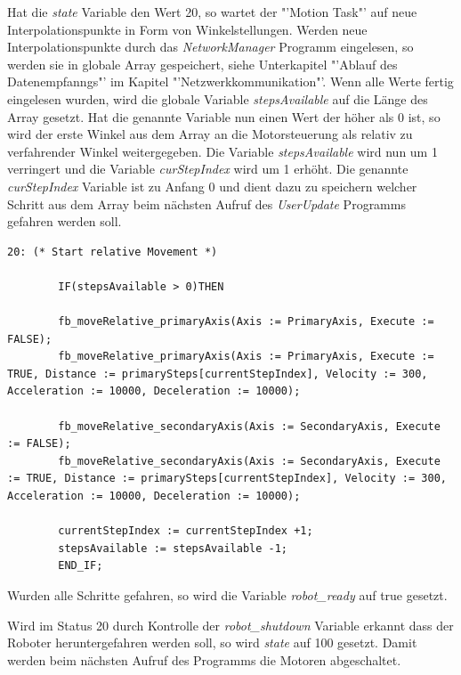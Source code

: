 Hat die \textit{state} Variable den Wert 20, so wartet der "'Motion Task"' auf neue Interpolationspunkte in Form von Winkelstellungen. Werden neue Interpolationspunkte durch das \textit{NetworkManager} Programm eingelesen, so werden sie in globale Array gespeichert, siehe Unterkapitel "'Ablauf des Datenempfanngs"' im Kapitel "'Netzwerkkommunikation"'. Wenn alle Werte fertig eingelesen wurden, wird die globale Variable \textit{stepsAvailable} auf die Länge des Array gesetzt. Hat die genannte Variable nun einen Wert der höher als 0 ist, so wird der erste Winkel aus dem Array an die Motorsteuerung als relativ zu verfahrender Winkel weitergegeben. Die Variable \textit{stepsAvailable} wird nun um 1 verringert und die Variable \textit{curStepIndex} wird um 1 erhöht. 
\newpage
Die genannte \textit{curStepIndex} Variable ist zu Anfang 0 und dient dazu zu speichern welcher Schritt aus dem Array beim nächsten Aufruf des \textit{UserUpdate} Programms gefahren werden soll.
\begin{lstlisting}[language = codesysls, captionpos=b, caption={Übergabe der Winkel an die Motoren}]
20: (* Start relative Movement *)

		IF(stepsAvailable > 0)THEN

		fb_moveRelative_primaryAxis(Axis := PrimaryAxis, Execute := FALSE);
		fb_moveRelative_primaryAxis(Axis := PrimaryAxis, Execute := TRUE, Distance := primarySteps[currentStepIndex], Velocity := 300, Acceleration := 10000, Deceleration := 10000);

		fb_moveRelative_secondaryAxis(Axis := SecondaryAxis, Execute := FALSE);
		fb_moveRelative_secondaryAxis(Axis := SecondaryAxis, Execute := TRUE, Distance := primarySteps[currentStepIndex], Velocity := 300, Acceleration := 10000, Deceleration := 10000);

		currentStepIndex := currentStepIndex +1;
		stepsAvailable := stepsAvailable -1;
		END_IF;
\end{lstlisting}

Wurden alle Schritte gefahren, so wird die Variable \textit{robot\_ready} auf true gesetzt. 

Wird im Status 20 durch Kontrolle der \textit{robot\_shutdown} Variable erkannt dass der Roboter heruntergefahren werden soll, so wird \textit{state} auf 100 gesetzt. Damit werden beim nächsten Aufruf des Programms die  Motoren abgeschaltet.




